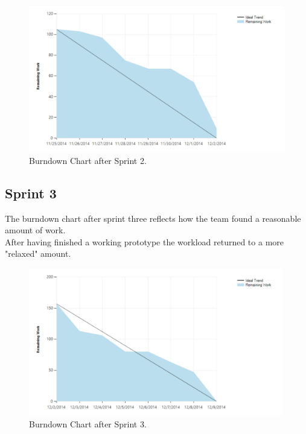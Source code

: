 \begin{figure}[H]
	\centering
	\includegraphics[scale=0.40]{Figures/Burndown2}
	\caption{Burndown Chart after Sprint 2.}
\end{figure}

\subsection{Sprint 3}
The burndown chart after sprint three reflects how the team found a reasonable amount of work. \\
After having finished a working prototype the workload returned to a more "relaxed" amount.

\begin{figure}[H]
	\centering
	\includegraphics[scale=0.40]{Figures/Burndown3}
	\caption{Burndown Chart after Sprint 3.}
\end{figure}

